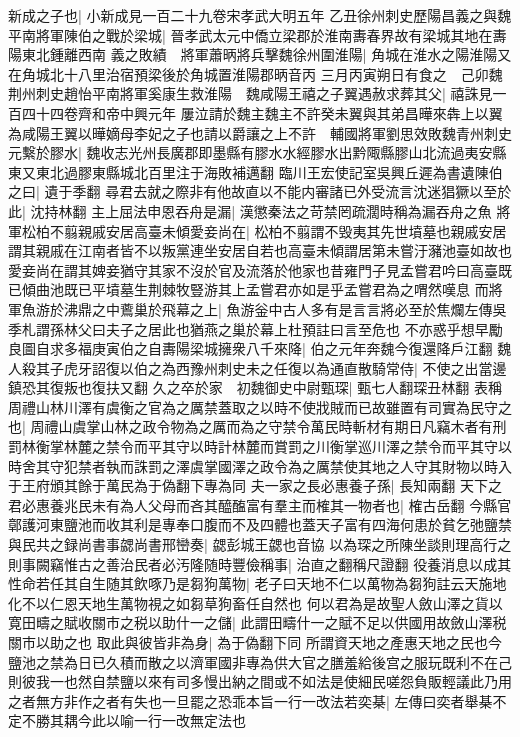 新成之子也|{
	小新成見一百二十九卷宋孝武大明五年}
乙丑徐州刺史歷陽昌義之與魏平南將軍陳伯之戰於梁城|{
	晉孝武太元中僑立梁郡於淮南夀春界故有梁城其地在夀陽東北鍾離西南}
義之敗績　將軍蕭昞將兵擊魏徐州圍淮陽|{
	角城在淮水之陽淮陽又在角城北十八里治宿預梁後於角城置淮陽郡昞音丙}
三月丙寅朔日有食之　己卯魏荆州刺史趙怡平南將軍奚康生救淮陽　魏咸陽王禧之子翼遇赦求葬其父|{
	禧誅見一百四十四卷齊和帝中興元年}
屢泣請於魏主魏主不許癸未翼與其弟昌曄來犇上以翼為咸陽王翼以曄嫡母李妃之子也請以爵讓之上不許　輔國將軍劉思效敗魏青州刺史元繫於膠水|{
	魏收志光州長廣郡即墨縣有膠水水經膠水出黔陬縣膠山北流過夷安縣東又東北過膠東縣城北百里注于海敗補邁翻}
臨川王宏使記室吳興丘遲為書遺陳伯之曰|{
	遺于季翻}
尋君去就之際非有他故直以不能内審諸已外受流言沈迷猖獗以至於此|{
	沈持林翻}
主上屈法申恩吞舟是漏|{
	漢懲秦法之苛禁罔疏濶時稱為漏吞舟之魚}
將軍松柏不翦親戚安居高臺未傾愛妾尚在|{
	松柏不翦謂不毁夷其先世墳墓也親戚安居謂其親戚在江南者皆不以叛黨連坐安居自若也高臺未傾謂居第未嘗汙瀦池臺如故也愛妾尚在謂其婢妾猶守其家不沒於官及流落於他家也昔雍門子見孟嘗君吟曰高臺既已傾曲池既已平墳墓生荆棘牧豎游其上孟嘗君亦如是乎孟嘗君為之喟然嘆息}
而將軍魚游於沸鼎之中鷰巢於飛幕之上|{
	魚游釡中古人多有是言言將必至於焦爛左傳吳季札謂孫林父曰夫子之居此也猶燕之巢於幕上杜預註曰言至危也}
不亦惑乎想早勵良圖自求多福庚寅伯之自夀陽梁城擁衆八千來降|{
	伯之元年奔魏今復還降戶江翻}
魏人殺其子虎牙詔復以伯之為西豫州刺史未之任復以為通直散騎常侍|{
	不使之出當邊鎮恐其復叛也復扶又翻}
久之卒於家　初魏御史中尉甄琛|{
	甄七人翻琛丑林翻}
表稱周禮山林川澤有虞衡之官為之厲禁蓋取之以時不使戕賊而已故雖置有司實為民守之也|{
	周禮山虞掌山林之政令物為之厲而為之守禁令萬民時斬材有期日凡竊木者有刑罰林衡掌林麓之禁令而平其守以時計林麓而賞罰之川衡掌巡川澤之禁令而平其守以時舍其守犯禁者執而誅罰之澤虞掌國澤之政令為之厲禁使其地之人守其財物以時入于王府頒其餘于萬民為于偽翻下專為同}
夫一家之長必惠養子孫|{
	長知兩翻}
天下之君必惠養兆民未有為人父母而吝其醯醢富有羣主而榷其一物者也|{
	榷古岳翻}
今縣官鄣護河東鹽池而收其利是專奉口腹而不及四體也蓋天子富有四海何患於貧乞弛鹽禁與民共之録尚書事勰尚書邢巒奏|{
	勰彭城王勰也音協}
以為琛之所陳坐談則理高行之則事闕竊惟古之善治民者必汚隆随時豐儉稱事|{
	治直之翻稱尺證翻}
役養消息以成其性命若任其自生随其飲啄乃是芻狗萬物|{
	老子曰天地不仁以萬物為芻狗註云天施地化不以仁恩天地生萬物視之如芻草狗畜任自然也}
何以君為是故聖人斂山澤之貨以寛田疇之賦收關市之税以助什一之儲|{
	此謂田疇什一之賦不足以供國用故斂山澤税關市以助之也}
取此與彼皆非為身|{
	為于偽翻下同}
所謂資天地之產惠天地之民也今鹽池之禁為日已久積而散之以濟軍國非專為供大官之膳羞給後宫之服玩既利不在己則彼我一也然自禁鹽以來有司多慢出納之間或不如法是使細民嗟怨負販輕議此乃用之者無方非作之者有失也一旦罷之恐乖本旨一行一改法若奕棊|{
	左傳曰奕者舉棊不定不勝其耦今此以喻一行一改無定法也}
